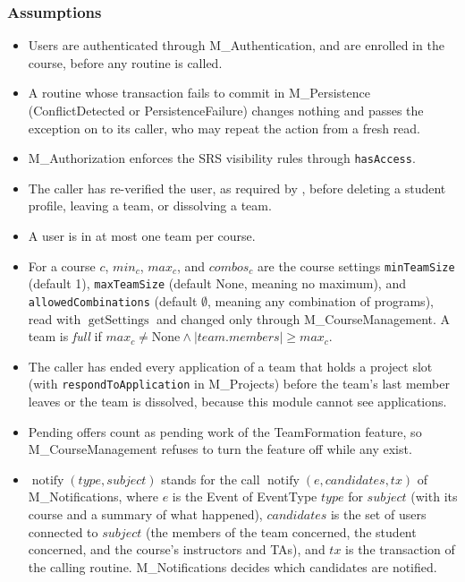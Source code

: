 \documentclass[12pt, titlepage]{article}
\newcommand{\descriptiveid}[1]{\texttt{\detokenize{#1}}}
\newcommand{\srsurl}{https://ayushpatel2026.github.io/Keystone/SRS/SRS.pdf}
\newcommand{\srsref}[1]{\href{\srsurl\#nameddest=#1}{\descriptiveid{#1}}}
\begin{document}
\subsubsection{Assumptions}

\begin{itemize}
    \item Users are authenticated through M\_Authentication, and are enrolled in the course, before any routine is called.
    \item A routine whose transaction fails to commit in M\_Persistence (ConflictDetected or PersistenceFailure) changes nothing and passes the exception on to its caller, who may repeat the action from a fresh read.
    \item M\_Authorization enforces the SRS visibility rules through \texttt{hasAccess}.
    \item The caller has re-verified the user, as required by \srsref{FR_ReverifyUsers}, before deleting a student profile, leaving a team, or dissolving a team.
    \item A user is in at most one team per course.
    \item For a course $c$, $\mathit{min}_c$, $\mathit{max}_c$, and $\mathit{combos}_c$ are the course settings \texttt{minTeamSize} (default 1), \texttt{maxTeamSize} (default None, meaning no maximum), and \texttt{allowedCombinations} (default $\emptyset$, meaning any combination of programs), read with $\operatorname{getSettings}$ and changed only through M\_CourseManagement. A team is \emph{full} if $\mathit{max}_c\ne\text{None}\land|team.members|\ge\mathit{max}_c$.
    \item The caller has ended every application of a team that holds a project slot (with \texttt{respondToApplication} in M\_Projects) before the team's last member leaves or the team is dissolved, because this module cannot see applications.
    \item Pending offers count as pending work of the TeamFormation feature, so M\_CourseManagement refuses to turn the feature off while any exist.
    \item $\operatorname{notify}(type,subject)$ stands for the call $\operatorname{notify}(e,\mathit{candidates},tx)$ of M\_Notifications, where $e$ is the Event of EventType $type$ for $subject$ (with its course and a summary of what happened), $\mathit{candidates}$ is the set of users connected to $subject$ (the members of the team concerned, the student concerned, and the course's instructors and TAs), and $tx$ is the transaction of the calling routine. M\_Notifications decides which candidates are notified.
\end{itemize}
\end{document}
